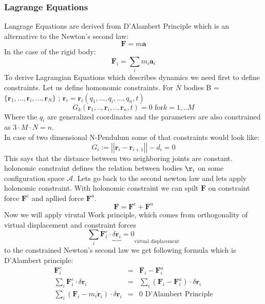 \subsubsection{Lagrange Equations}
Langrage Equations are derived from D’Alambert Principle which is an alternative to the Newton's second law\cite{ClassPhy}:
\begin{equation}
	\mathbf{F} = m\mathbf{a}
\end{equation}   
In the case of the rigid body:
\begin{equation}
	\mathbf{F}_i = \sum_i{m_i \mathbf{a}_i}
\end{equation}
To derive Lagrangian Equations which describes dynamics we need first to define constraints. Let us define homonomic constraints.
For $N$ bodies B = $\{\mathbf{r}_1,...,\mathbf{r}_i,...,\mathbf{r}_N\}\text{ ; } \mathbf{r}_i=\mathbf{r}_i(q_1,...,q_i,...,q_n, t)$
\begin{equation}
	\boxed{G_k(\mathbf{r}_1,..,\mathbf{r}_i,..,\mathbf{r}_n,t)=0\text{ for}k=1,..M}
\end{equation}
Where the $q_i$ are generalized coordinates and the
parameters are also constrained as $3\cdot M\cdot N = n$.\\
In case of two dimensional N-Pendulum some of that constraints would look like:
\begin{equation}
	G_i := \left|\left|\mathbf{r}_i - \mathbf{r}_{i+1}\right|\right| - d_i = 0
\end{equation}
This says that the distance between two neighboring joints are constant.
holonomic constraint defines the relation between bodies $\r_i$ on some configuration space $\mathcal{A}$.
Lets go back to the second newton law and lets apply holonomic constraint. With holonomic constraint we can spilt $\mathbf{F}$ on constraint force $\mathbf{F}^c$ and apllied force $\mathbf{F}^a$.
\begin{equation}
	\mathbf{F} =\mathbf{F}^c + \mathbf{F}^a
\end{equation}
Now we will apply virutal Work principle, which comes from orthogonality of virtual displacement and constraint forces \cite{ortho}
\begin{equation}
	\boxed{\sum_i{\mathbf{F}_i^c \cdot \underbrace{\delta \mathbf{r}_i}=0}_\text{virtual displacement}}
\end{equation}
to the constrained Newton's second law we get following formula which is D'Alambert principle\cite{dalam}:
\begin{eqnarray}
	 \mathbf{F}^c_i &=& \mathbf{F}_i- \mathbf{F}^a_i\\
	 \sum_i{\mathbf{F}_i^c \cdot \delta \mathbf{r}_i} &=& \sum_i{(\mathbf{F}_i- \mathbf{F}^a_i) \cdot \delta \mathbf{r}_i}\\
	 \sum_i{(\mathbf{F}_i- m_i\ddot{\mathbf{r}}_i) \cdot \delta \mathbf{r}_i}&=&0\text{    D'Alambert Principle}
\end{eqnarray}\\
